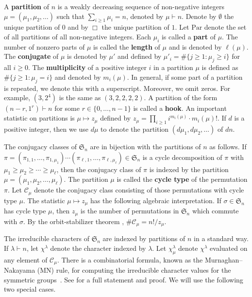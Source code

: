 \documentclass[Unicode,ALCO]{cedram}
\newcommand{\CC}{\mathcal{C}}
\newcommand{\FS}{\mathfrak{S}}
\newcommand{\myemph}{\textbf}
\newcommand{\Par}{\text{Par}}
\begin{document}
A \myemph{partition} of \(n\) is a weakly decreasing sequence of non-negative integers \(\mu = (\mu_1,\mu_2,\ldots)\) such that \(\sum_{i \geq 1} \mu_i = n\), denoted by \(\mu \vdash n\).
Denote by \(\emptyset\) the unique partition of \(0\) and by \(\Box\) the unique partition of \(1\).
Let \(\Par\) denote the set of all partitions of all non-negative integers.
Each \(\mu_i\) is called a \myemph{part} of \(\mu\).
The number of nonzero parts of \(\mu\) is called the \myemph{length} of \(\mu\) and is denoted by \(\ell(\mu)\).
The \myemph{conjugate} of \(\mu\) is denoted by \(\mu'\) and defined by \(\mu'_i = \# \{j \geq 1 : \mu_j \geq i\}\) for all \(i \geq 0\).
The \myemph{multiplicity} of a positive integer \(i\) in a partition \(\mu\) is defined as \(\# \{j \geq 1 : \mu_j = i \}\) and denoted by \(m_i (\mu)\).
In general, if some part of a partition is repeated, we denote this with a superscript.
Moreover, we omit zeros.
For example, \((3,2^4)\) is the same as \((3,2,2,2,2)\).
A partition of the form \((n-r,1^r) \vdash n\) for some \(r \in \{0,\ldots,n-1\}\) is called a \myemph{hook}.
An important statistic on partitions is \(\mu \mapsto z_\mu\) defined by \(z_\mu = \prod_{i \geq 1} i^{m_i(\mu)} \cdot m_i(\mu)!\).
If \(d\) is a positive integer, then we use \(d \mu\) to denote the partition \((d \mu_1, d \mu_2, \ldots )\) of \(dn\).

The conjugacy classes of \(\FS_n\) are in bijection with the partitions of \(n\) as follows.
If \(\pi = (\pi_{1,1},\ldots,\pi_{1,\mu_1}) \cdots (\pi_{\ell,1},\ldots,\pi_{\ell,\mu_\ell}) \in \FS_n\) is a cycle decomposition of $\pi$ with $\mu_1 \geq \mu_2 \geq \cdots \geq \mu_\ell$, then the conjugacy class of $\pi$ is indexed by the partition $\mu = (\mu_1,\mu_2,\ldots,\mu_\ell)$.
The partition \(\mu\) is called the \myemph{cycle type} of the permutation $\pi$.
Let $\CC_\mu$ denote the conjugacy class consisting of those permutations with cycle type $\mu$.
The statistic $\mu \mapsto z_\mu$ has the following algebraic interpretation.
If $\sigma \in \FS_n$ has cycle type $\mu$, then $z_\mu$ is the number of permutations in $\FS_n$ which commute with $\sigma$.
By the orbit-stabilizer theorem \cite[Proposition~4.3.6]{DF},
\(\# \CC_\mu = n! / z_\mu\).

The irreducible characters of \(\FS_n\) are indexed by partitions of \(n\) in a standard way.
If $\lambda \vdash n$, let $\chi^\lambda$ denote the character indexed by $\lambda$.
Let $\chi^\lambda_\mu$ denote $\chi^\lambda$ evaluated on any element of \(\CC_\mu\).
There is a combinatorial formula, known as the Murnaghan--Nakayama (MN) rule, for computing the irreducible character values for the symmetric groups~\cite{murnaghan, nakayama}. See \cite[Theorem~7.17.3]{EC2} for a full statement and proof.
We will use the following two special cases.
\end{document}
